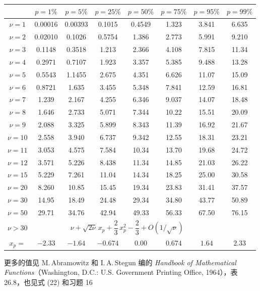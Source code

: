 \begin{table}[h]
\centering
\begin{tabular}{|c|c|c|c|c|c|c|c|}
\hline
 & $p=1\%$ & $p=5\%$ & $p=25\%$ & $p=50\%$ & $p=75\%$ & $p=95\%$ & $p=99\%$ \\
\hline
$\nu=1$ & 0.00016 & 0.00393 & 0.1015 & 0.4549 & 1.323 & 3.841 & 6.635 \\
\hline
$\nu=2$ & 0.02010 & 0.1026 & 0.5754 & 1.386 & 2.773 & 5.991 & 9.210 \\
\hline
$\nu=3$ & 0.1148 & 0.3518 & 1.213 & 2.366 & 4.108 & 7.815 & 11.34 \\
\hline
$\nu=4$ & 0.2971 & 0.7107 & 1.923 & 3.357 & 5.385 & 9.488 & 13.28 \\
\hline
$\nu=5$ & 0.5543 & 1.1455 & 2.675 & 4.351 & 6.626 & 11.07 & 15.09 \\
\hline
$\nu=6$ & 0.8721 & 1.635 & 3.455 & 5.348 & 7.841 & 12.59 & 16.81 \\
\hline
$\nu=7$ & 1.239 & 2.167 & 4.255 & 6.346 & 9.037 & 14.07 & 18.48 \\
\hline
$\nu=8$ & 1.646 & 2.733 & 5.071 & 7.344 & 10.22 & 15.51 & 20.09 \\
\hline
$\nu=9$ & 2.088 & 3.325 & 5.899 & 8.343 & 11.39 & 16.92 & 21.67 \\
\hline
$\nu=10$ & 2.558 & 3.940 & 6.737 & 9.342 & 12.55 & 18.31 & 23.21 \\
\hline
$\nu=11$ & 3.053 & 4.575 & 7.584 & 10.34 & 13.70 & 19.68 & 24.72 \\
\hline
$\nu=12$ & 3.571 & 5.226 & 8.438 & 11.34 & 14.85 & 21.03 & 26.22 \\
\hline
$\nu=15$ & 5.229 & 7.261 & 11.04 & 14.34 & 18.25 & 25.00 & 30.58 \\
\hline
$\nu=20$ & 8.260 & 10.85 & 15.45 & 19.34 & 23.83 & 31.41 & 37.57 \\
\hline
$\nu=30$ & 14.95 & 18.49 & 24.48 & 29.34 & 34.80 & 43.77 & 50.89 \\
\hline
$\nu=50$ & 29.71 & 34.76 & 42.94 & 49.33 & 56.33 & 67.50 & 76.15 \\
\hline
$\nu>30$ & \multicolumn{6}{c|}{$\nu + \sqrt{2\nu}\,x_p + \dfrac{2}{3}\,x_p^2 - \dfrac{2}{3} + O(1/\sqrt{\nu})$} \\
\hline
$x_p =$ & $-2.33$ & $-1.64$ & $-0.674$ & $0.00$ & $0.674$ & $1.64$ & $2.33$ \\
\hline
\end{tabular}
\end{table}

\noindent 更多的值见 M.\,Abramowitz 和 I.\,A.\,Stegun 编的 \textit{Handbook of Mathematical Functions}（Washington, D.C.: U.S. Government Printing Office, 1964），表 26.8，也见式 (22) 和习题 16

